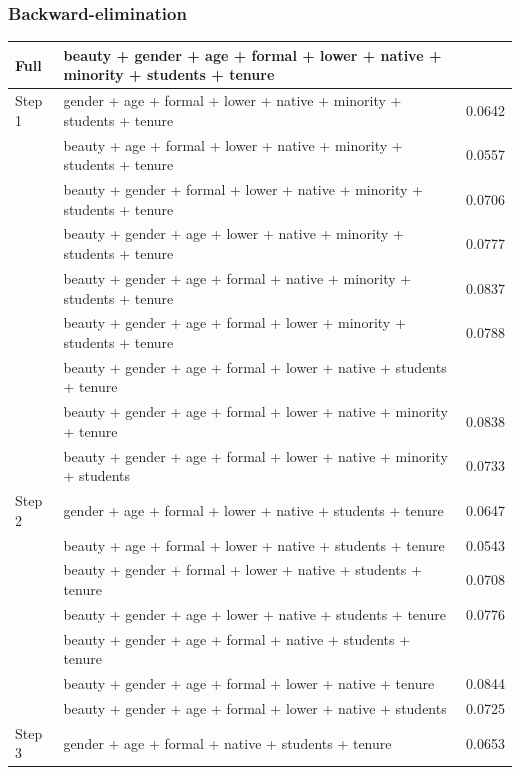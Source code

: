 \begin{frame}[shrink]
\frametitle{Backward-elimination}

\vspace{-0.3cm}

{\tiny
\begin{tabular}{l | l | c}
Full		& beauty + gender + age + formal + lower + native + minority + students + tenure & \orange{0.0839} \pause \\
\hline
Step 1 	& gender + age + formal + lower + native + minority + students + tenure		& 0.0642 \\
		& beauty + age + formal + lower + native + minority + students + tenure		& 0.0557 \\
		& beauty + gender + formal + lower + native + minority + students + tenure	& 0.0706 \\
		& beauty + gender + age + lower + native + minority + students + tenure		& 0.0777 \\
		& beauty + gender + age + formal + native + minority + students + tenure		& 0.0837 \\
		& beauty + gender + age + formal + lower + minority + students + tenure		& 0.0788 \\
		& beauty + gender + age + formal + lower + native + students + tenure		& \orange{0.0842} \\
		& beauty + gender + age + formal + lower + native + minority + tenure		& 0.0838 \\
		& beauty + gender + age + formal + lower + native + minority + students		& 0.0733 \pause \\
\hline		
Step 2	& gender + age + formal + lower + native + students + tenure 				& 0.0647 \\
		& beauty + age + formal + lower + native + students + tenure 				& 0.0543 \\
		& beauty + gender + formal + lower + native + students + tenure 			& 0.0708 \\
		& beauty + gender + age + lower + native + students + tenure 				&0.0776  \\
		& beauty + gender + age + formal + native + students + tenure 			& \orange{0.0846} \\
		& beauty + gender + age + formal + lower + native + tenure 				& 0.0844 \\
		& beauty + gender + age + formal + lower + native + students 				& 0.0725 \pause \\
\hline
Step 3	& gender + age + formal + native + students + tenure 					& 0.0653 \\

\end{tabular}}
\end{frame}
